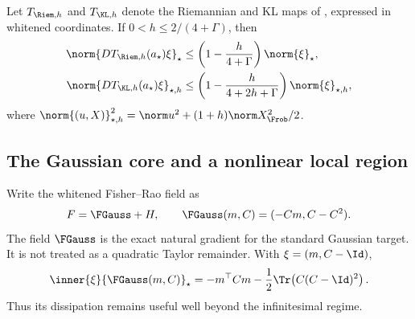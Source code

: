 \begin{corollary}
\label{cor:local-linear-maps}
Let \(T_{\Riem,h}\) and \(T_{\KL,h}\) denote the Riemannian and KL maps of
, expressed in whitened coordinates.  If
\(0<h\leq2/(4+\Gamma)\), then
\begin{align}
  \norm{DT_{\Riem,h}(a_\star)\xi}_\star
  &\leq
  \left(1-\frac{h}{4+\Gamma}\right)\norm{\xi}_\star,
  \label{eq:local-linear-riem}\\
  \norm{DT_{\KL,h}(a_\star)\xi}_{\star,h}
  &\leq
  \left(1-\frac{h}{4+2h+\Gamma}\right)
  \norm{\xi}_{\star,h},
  \label{eq:local-linear-kl}
\end{align}
where
\(\norm{(u,X)}_{\star,h}^2
=\norm u^2+(1+h)\norm X_{\Frob}^2/2\).
\end{corollary}

\subsection{The Gaussian core and a nonlinear local region}
\label{sec:local-gaussian-core}

Write the whitened Fisher--Rao field as
\[
  F=\FGauss+H,
  \qquad
  \FGauss(m,C)=(-Cm,C-C^2).
\]
The field \(\FGauss\) is the exact natural gradient for the standard Gaussian
target.  It is not treated as a quadratic Taylor remainder.  With
\(\xi=(m,C-\Id)\),
\begin{equation}
  \inner{\xi}{\FGauss(m,C)}_\star
  =
  -m^\top Cm-\frac12\Tr\!\left(C(C-\Id)^2\right).
  \label{eq:local-gaussian-dissipation}
\end{equation}
Thus its dissipation remains useful well beyond the infinitesimal regime.

